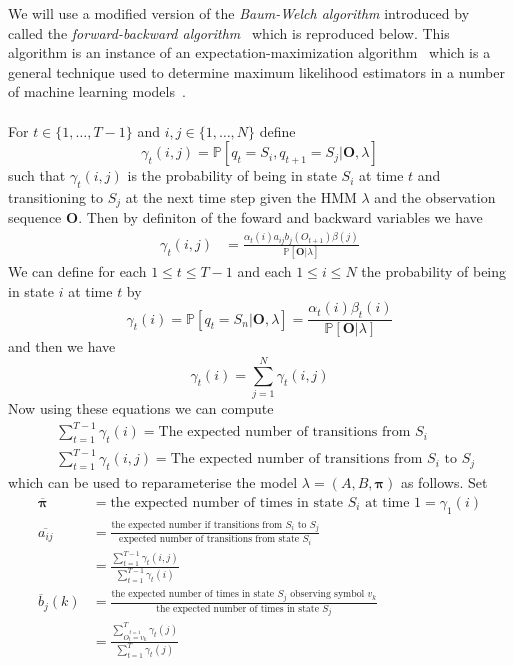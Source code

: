 We will use a modified version of the \emph{Baum-Welch algorithm} introduced by~\citet{baum1970maximization} called the \emph{forward-backward algorithm}~\citep{rabiner1989tutorial} which is reproduced below. This algorithm is an instance of an expectation-maximization algorithm~\citep{moon1996expectation} which is a general technique used to determine maximum likelihood estimators in a number of machine learning models~\citep{bishop2006pattern}. \\
\\
For $t \in \{1, \dots, T-1\}$ and $i,j \in \{1, \dots, N\}$ define
\begin{equation*}
\gamma_t(i,j) = \mathbb{P}[q_t = S_i, q_{t+1}=S_j| \bm{O}, \lambda]
\end{equation*}
such that $\gamma_t(i,j)$ is the probability of being in state $S_i$ at time $t$ and transitioning to $S_j$ at the next time step given the HMM $\lambda$ and the observation sequence $\bm{O}$. Then by definiton of the foward and backward variables we have
\begin{align*}
\gamma_t(i,j) &= \frac{\alpha_t(i)a_{ij}b_j(O_{t+1})\beta(j)}{\mathbb{P}[\bm{O}|\lambda]}	
\end{align*}
We can define for each $1 \leq t \leq T-1$ and each $1 \leq i \leq N$ the probability of being in state $i$ at time $t$ by
\begin{equation*}
\gamma_t(i) = \mathbb{P}[q_t = S_n | \bm{O}, \lambda] = \frac{\alpha_t(i)\beta_t(i)}{\mathbb{P}[\bm{O}|\lambda]}
\end{equation*}
and then we have
\begin{equation*}
\gamma_t(i) = \sum_{j=1}^N \gamma_t(i,j)
\end{equation*}
Now using these equations we can compute
\begin{align*}
&\sum_{t=1}^{T-1} \gamma_t(i) = \text{The expected number of transitions from $S_i$} \\
&\sum_{t=1}^{T-1} \gamma_t(i,j) =  \text{The expected number of transitions from $S_i$ to $S_j$}
\end{align*}
which can be used to reparameterise the model $\lambda = (A,B,\bm{\pi})$ as follows. Set
\begin{align*}
\overline{\bm{\pi}} &= \text{the expected number of times in state $S_i$ at time $1$} = \gamma_1(i) \\
\overline{a_{ij}} &= \frac{\text{the expected number if transitions from $S_i$ to $S_j$}}{\text{expected number of transitions from state $S_i$}} \\ 
				&= \frac{\sum_{t=1}^{T-1} \gamma_t(i,j)}{\sum_{t=1}^{T-1} \gamma_t(i)} \\
\overline{b}_j(k) &= \frac{\text{the expected number of times in state $S_j$ observing symbol $v_k$}}{\text{the expected number of times in state $S_j$}} \\
				&=\frac{\sum_{\stackrel{t=1}{O_t=v_k}}^{T}\gamma_t(j)}{\sum_{t=1}^T \gamma_t(j)}
\end{align*}
